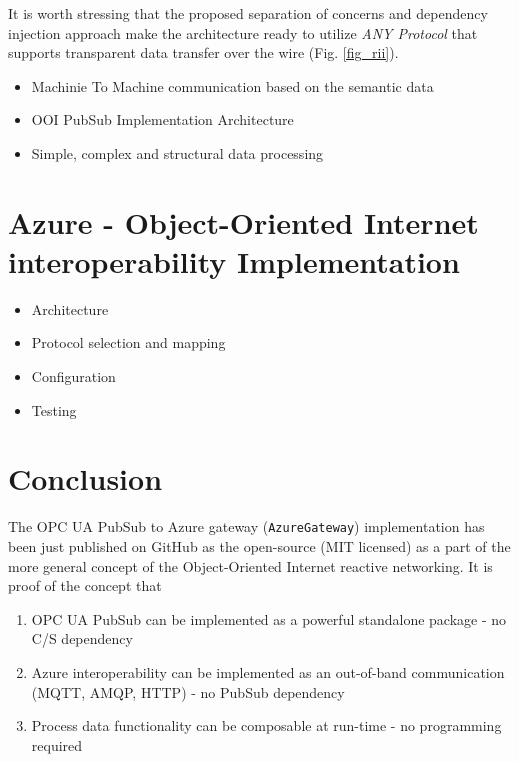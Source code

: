 \documentclass{jacsart}
\providecommand{\tightlist} { \setlength{\itemsep}{0pt}\setlength{\parskip}{0pt}}
\begin{document}
It is worth stressing that the proposed separation of concerns and dependency injection approach make the architecture ready to utilize \emph{ANY Protocol} that supports transparent data transfer over the wire (Fig. \ref*{fig_rii}).

\begin{itemize}
      \tightlist
      \item Machinie To Machine communication based on the semantic data
      \item OOI PubSub Implementation Architecture
      \item Simple, complex and structural data processing
\end{itemize}


\section{Azure - Object-Oriented Internet interoperability Implementation}\label{gateway-implementation}




\begin{itemize}
      \tightlist
      \item
            Architecture
      \item
            Protocol selection and mapping
      \item
            Configuration
      \item
            Testing
\end{itemize}

\section{Conclusion}\label{conclusion}

The OPC UA PubSub to Azure gateway (\texttt{AzureGateway})
implementation has been just published on GitHub as the open-source (MIT
licensed) as a part of the more general concept of the Object-Oriented
Internet reactive networking. It is proof of the concept that

\begin{enumerate}
      \def\labelenumi{\arabic{enumi}.}
      \tightlist
      \item
            OPC UA PubSub can be implemented as a powerful standalone package - no C/S dependency
      \item
            Azure interoperability can be implemented as an out-of-band
            communication (MQTT, AMQP, HTTP) - no PubSub dependency
      \item
            Process data functionality can be composable at run-time - no
            programming required
\end{enumerate}



\end{document}

